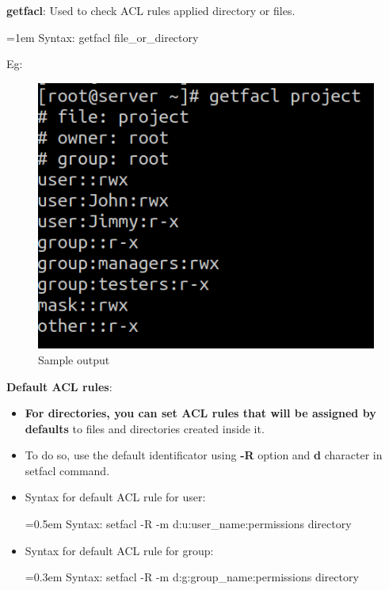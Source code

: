 \begin{flushleft}
	\bigskip
	\textbf{getfacl}: Used to check ACL rules applied directory or files.
	\begin{tcolorbox}[breakable,notitle,boxrule=-0pt,colback=pink,colframe=pink]
		\color{black}
		\font=1em
		Syntax: getfacl  file\_or\_directory
		\font=4pt
	\end{tcolorbox}
	Eg:
	\begin{figure}[h!]
		\centering
		\includegraphics[scale=0.6]{content/chapter6/images/getfacl.png}
		\caption{Sample output}
		\label{fig:getfacl}
	\end{figure}
	
	
\newpage

\textbf{Default ACL rules}: 
\begin{itemize}
	\item \textbf{For directories, you can set ACL rules that will be assigned by defaults} to files and directories created inside it. 
	\item To do so, use the default identificator using \textbf{-R} option and \textbf{d} character in setfacl command.
	\item Syntax for default ACL rule for user:
	\bigskip
	\begin{tcolorbox}[breakable,notitle,boxrule=-0pt,colback=pink,colframe=pink]
		\color{black}
		\font=0.5em
		Syntax: setfacl -R -m d:u:user\_name:permissions directory
		\font=4pt
	\end{tcolorbox}

	\item Syntax for default ACL rule for group:
	\bigskip
	\begin{tcolorbox}[breakable,notitle,boxrule=-0pt,colback=pink,colframe=pink]
		\color{black}
		\font=0.3em
		Syntax: setfacl -R -m d:g:group\_name:permissions directory
		\font=4pt
	\end{tcolorbox}


\end{itemize}
\end{flushleft}
